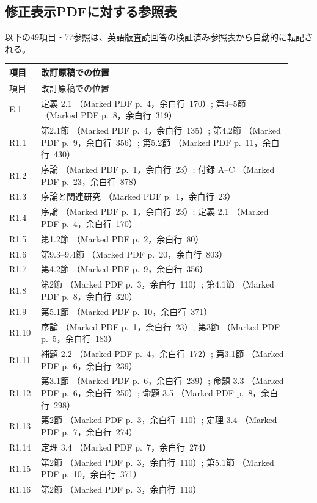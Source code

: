 \documentclass[10pt,a4paper]{ltjsarticle}
\begin{document}
\subsection*{修正表示PDFに対する参照表}
以下の49項目・77参照は、英語版査読回答の検証済み参照表から自動的に転記される。
\begingroup\small
\setlength{\LTpre}{4pt}\setlength{\LTpost}{6pt}
\begin{longtable}{@{}p{0.09\linewidth}p{0.83\linewidth}@{}}
\toprule
項目 & 改訂原稿での位置\\
\midrule\endfirsthead
\toprule
項目 & 改訂原稿での位置\\
\midrule\endhead
E.1 & 定義 2.1 （Marked PDF p.~4，余白行~170）; 第4--5節 （Marked PDF p.~8，余白行~319）\\
R1.1 & 第2.1節 （Marked PDF p.~4，余白行~135）; 第4.2節 （Marked PDF p.~9，余白行~356）; 第5.2節 （Marked PDF p.~11，余白行~430）\\
R1.2 & 序論 （Marked PDF p.~1，余白行~23）; 付録 A--C （Marked PDF p.~23，余白行~878）\\
R1.3 & 序論と関連研究 （Marked PDF p.~1，余白行~23）\\
R1.4 & 序論 （Marked PDF p.~1，余白行~23）; 定義 2.1 （Marked PDF p.~4，余白行~170）\\
R1.5 & 第1.2節 （Marked PDF p.~2，余白行~80）\\
R1.6 & 第9.3--9.4節 （Marked PDF p.~20，余白行~803）\\
R1.7 & 第4.2節 （Marked PDF p.~9，余白行~356）\\
R1.8 & 第2節 （Marked PDF p.~3，余白行~110）; 第4.1節 （Marked PDF p.~8，余白行~320）\\
R1.9 & 第5.1節 （Marked PDF p.~10，余白行~371）\\
R1.10 & 序論 （Marked PDF p.~1，余白行~23）; 第3節 （Marked PDF p.~5，余白行~183）\\
R1.11 & 補題 2.2 （Marked PDF p.~4，余白行~172）; 第3.1節 （Marked PDF p.~6，余白行~239）\\
R1.12 & 第3.1節 （Marked PDF p.~6，余白行~239）; 命題 3.3 （Marked PDF p.~6，余白行~250）; 命題 3.5 （Marked PDF p.~8，余白行~298）\\
R1.13 & 第2節 （Marked PDF p.~3，余白行~110）; 定理 3.4 （Marked PDF p.~7，余白行~274）\\
R1.14 & 定理 3.4 （Marked PDF p.~7，余白行~274）\\
R1.15 & 第2節 （Marked PDF p.~3，余白行~110）; 第5.1節 （Marked PDF p.~10，余白行~371）\\
R1.16 & 第2節 （Marked PDF p.~3，余白行~110）\\

\end{longtable}
\end{document}
